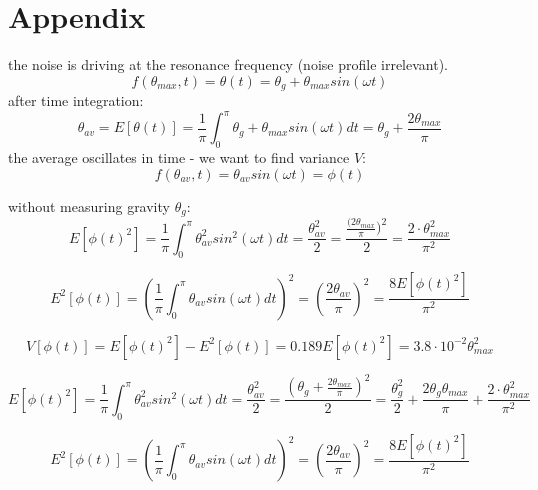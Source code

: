 \documentclass[\main/master.tex]{subfiles}
\begin{document}
\newspacing
\chapter{Appendix}\label{chapter:Appendix}
the noise is driving at the resonance frequency (noise profile irrelevant). 
\begin{equation}
f(\theta_{max},t) = \theta(t)  = \theta_g+\theta_{max} sin(\omega t)
\label{eqn:rms}
\end{equation}
after time integration:
\begin{equation}
\theta_{av}=E[\theta(t)]=\frac{1}{\pi}\int_0^{\pi}\theta_g+\theta_{max} sin(\omega t) dt=\theta_g+\frac{2 \theta_{max}}{\pi}  
\label{eqn:av}
\end{equation}
the average oscillates in time - we want to find variance $V$:
\begin{equation}
f(\theta_{av},t) =  \theta_{av} sin(\omega t) =\phi(t)
\label{eqn:rms}
\end{equation}

without measuring gravity $\theta_g$:
\begin{equation}
E[\phi(t)^2]=\frac{1}{\pi}\int_0^{\pi}\theta_{av}^2 sin^2(\omega t) dt = \frac{\theta_{av}^2}{2} =  \frac{\frac{(2 \theta_{max}}{\pi})^2}{2} = \frac{2\cdot \theta_{max}^2}{\pi^2} 
\label{eqn:av}
\end{equation}

\begin{equation}
E^2[\phi(t)]=(\frac{1}{\pi}\int_0^{\pi}\theta_{av} sin(\omega t) dt)^2 =(\frac{2 \theta_{av}}{\pi})^2  = \frac{8 E[\phi(t)^2]}{\pi^2}
\label{eqn:av}
\end{equation}


\begin{equation}
V[\phi(t)] = E[\phi(t)^2] - E^2[\phi(t)] = 0.189E [\phi(t)^2] = 3.8\cdot 10^{-2} \theta_{max}^2
\end{equation}



\begin{equation}
E[\phi(t)^2]=\frac{1}{\pi}\int_0^{\pi}\theta_{av}^2 sin^2(\omega t) dt = \frac{\theta_{av}^2}{2} =  \frac{(\theta_g+\frac{2 \theta_{max}}{\pi} )^2}{2} = \frac{\theta_g^2}{2} +\frac{2 \theta_g\theta_{max}}{\pi}+\frac{2\cdot \theta_{max}^2}{\pi^2} 
\label{eqn:av}
\end{equation}

\begin{equation}
E^2[\phi(t)]=(\frac{1}{\pi}\int_0^{\pi}\theta_{av} sin(\omega t) dt)^2 =(\frac{2 \theta_{av}}{\pi})^2  = \frac{8 E[\phi(t)^2]}{\pi^2}
\label{eqn:av}
\end{equation}
\end{document}
